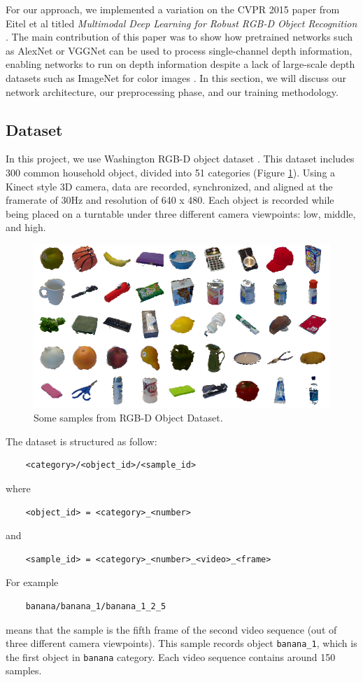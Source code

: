 

For our approach, we implemented a variation on the CVPR 2015 paper from Eitel et al titled \textit{Multimodal Deep Learning for Robust RGB-D Object Recognition} \cite{Eitel2015}. The main contribution of this paper was to show how pretrained networks such as AlexNet or VGGNet can be used to process single-channel depth information, enabling networks to run on depth information despite a lack of large-scale depth datasets such as ImageNet for color images \cite{ImageNet2015}. In this section, we will discuss our network architecture, our preprocessing phase, and our training methodology.

\subsection{Dataset}
\label{subsec:dataset}
In this project, we use Washington RGB-D object dataset \cite{Lai2011_rgbddata} . This dataset includes 300 common household object, divided into 51 categories (Figure \ref{fig:rgbd_dataset}). Using a Kinect style 3D camera, data are recorded, synchronized, and aligned at the framerate of 30Hz and resolution of 640 x 480. Each object is recorded while being placed on a turntable under three different camera viewpoints: low, middle, and high. 

\begin{figure}
	\centering
	\includegraphics[width=0.85\linewidth]{img/rgbd_dataset2.png}
	\caption{Some samples from RGB-D Object Dataset.}
	\label{fig:rgbd_dataset}
\end{figure}

The dataset is structured as follow:
\begin{verbatim}
    <category>/<object_id>/<sample_id>
\end{verbatim}
where
\begin{verbatim}
    <object_id> = <category>_<number>
\end{verbatim}
and
\begin{verbatim}
    <sample_id> = <category>_<number>_<video>_<frame>
\end{verbatim}
For example
\begin{verbatim}
    banana/banana_1/banana_1_2_5
\end{verbatim}
means that the sample is the fifth frame of the second video sequence (out of three different camera viewpoints). This sample records object \texttt{banana\_1}, which is the first object in \texttt{banana} category. Each video sequence contains around 150 samples.

